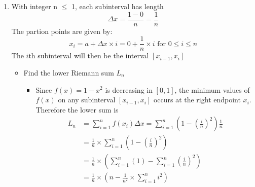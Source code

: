 \documentclass{article}
\begin{document}
    \begin{enumerate}[label=({\alph*})]
        \item With integer n \(\leq\) 1, each subinterval has length
        \[\Delta x =  \frac{1 - 0}{n} = \frac{1}{n}\]
        The partion points are given by:
        \[x_{i} = a + \Delta x \times i = 0 + \frac{1}{n} \times i \text{ for }  0 \leq i \leq n\]
        The \(i\)th subinterval will then be the interval \([x_{i - 1}, x_{i}]\)
        \begin{itemize}
            \item Find the lower Riemann sum \(L_{n}\)
            \begin{itemize}
                \item Since \(f(x) = 1 - x^{2}\) is decreasing in \([0, 1]\), the minimum values of \(f(x)\) on any subinterval \([x_{i - 1}, x_{i}]\) occurs at the right endpoint \(x_{i}\). Therefore the lower sum is
                \begin{align}
                    L_{n} &= \sum_{i=1}^n f(x_i) \Delta x = \sum_{i=1}^n \left(1 - \left(\frac{i}{n}\right)^2\right) \frac{1}{n}\\
                          &= \frac{1}{n} \times \sum_{i=1}^n \left(1 - \left(\frac{i}{n}\right)^2\right) \\
                          &= \frac{1}{n} \times  \left(\sum_{i=1}^n(1) - \sum_{i = 1}^n(\frac{i}{n})^2\right)\\
                          &= \frac{1}{n} \times  \left(n - \frac{1}{n^2} \times \sum_{i = 1}^n i^{2}\right) \label{2:a:1}
                \end{align}


\end{itemize}
\end{itemize}
\end{enumerate}
\end{document}
